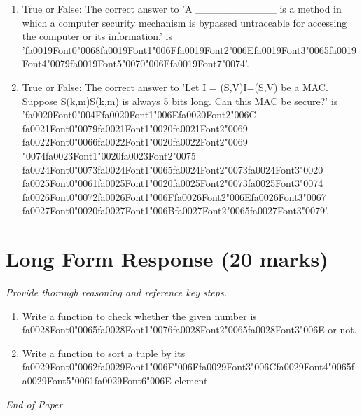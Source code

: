 \documentclass[12pt]{article}
\begin{document}
\begin{enumerate}[label=\arabic*.]
\item True or False: The correct answer to 'A \_\_\_\_\_\_\_\_\_\_\_ is a method in which a computer security mechanism is bypassed untraceable for accessing the computer or its information.' is '{\csname fa0019Font0\endcsname\char"0068}{\csname fa0019Font1\endcsname\char"006F}{\csname fa0019Font2\endcsname\char"006E}{\csname fa0019Font3\endcsname\char"0065}{\csname fa0019Font4\endcsname\char"0079}{\csname fa0019Font5\endcsname\char"0070}{\char"006F}{\csname fa0019Font7\endcsname\char"0074}'.
\item True or False: The correct answer to 'Let I = (S,V)I=(S,V) be a MAC. Suppose S(k,m)S(k,m) is always 5 bits long. Can this MAC be secure?' is '{\csname fa0020Font0\endcsname\char"004F}{\csname fa0020Font1\endcsname\char"006E}{\csname fa0020Font2\endcsname\char"006C} {\csname fa0021Font0\endcsname\char"0079}{\csname fa0021Font1\endcsname\char"0020}{\csname fa0021Font2\endcsname\char"0069} {\csname fa0022Font0\endcsname\char"0066}{\csname fa0022Font1\endcsname\char"0020}{\csname fa0022Font2\endcsname\char"0069} {\char"0074}{\csname fa0023Font1\endcsname\char"0020}{\csname fa0023Font2\endcsname\char"0075} {\csname fa0024Font0\endcsname\char"0073}{\csname fa0024Font1\endcsname\char"0065}{\csname fa0024Font2\endcsname\char"0073}{\csname fa0024Font3\endcsname\char"0020} {\csname fa0025Font0\endcsname\char"0061}{\csname fa0025Font1\endcsname\char"0020}{\csname fa0025Font2\endcsname\char"0073}{\csname fa0025Font3\endcsname\char"0074} {\csname fa0026Font0\endcsname\char"0072}{\csname fa0026Font1\endcsname\char"006F}{\csname fa0026Font2\endcsname\char"006E}{\csname fa0026Font3\endcsname\char"0067} {\csname fa0027Font0\endcsname\char"0020}{\csname fa0027Font1\endcsname\char"006B}{\csname fa0027Font2\endcsname\char"0065}{\csname fa0027Font3\endcsname\char"0079}'.
\end{enumerate}

\section*{Long Form Response (20 marks)}
\textit{Provide thorough reasoning and reference key steps.}
\begin{enumerate}[label=\arabic*.]
\item Write a function to check whether the given number is {\csname fa0028Font0\endcsname\char"0065}{\csname fa0028Font1\endcsname\char"0076}{\csname fa0028Font2\endcsname\char"0065}{\csname fa0028Font3\endcsname\char"006E} or not.
\item Write a function to sort a tuple by its {\csname fa0029Font0\endcsname\char"0062}{\csname fa0029Font1\endcsname\char"006F}{\char"006F}{\csname fa0029Font3\endcsname\char"006C}{\csname fa0029Font4\endcsname\char"0065}{\csname fa0029Font5\endcsname\char"0061}{\csname fa0029Font6\endcsname\char"006E} element.
\end{enumerate}

\vfill
\noindent\textit{End of Paper}
\end{document}
